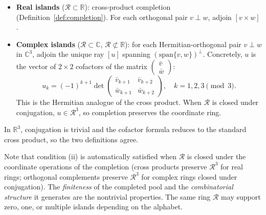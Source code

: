 \documentclass[12pt,a4paper]{article}
\newcommand{\R}{\mathbb{R}}
\newcommand{\C}{\mathbb{C}}
\begin{document}
\begin{itemize}
    \item \textbf{Real islands} ($\mathcal{R} \subset \R$): cross-product completion (Definition~\ref{def:completion}). For each orthogonal pair $v \perp w$, adjoin $[v \times w]$.
    \item \textbf{Complex islands} ($\mathcal{R} \subset \C$, $\mathcal{R} \not\subset \R$): for each Hermitian-orthogonal pair $v \perp w$ in $\C^3$, adjoin the unique ray $[u]$ spanning $(\mathrm{span}\{v,w\})^\perp$. Concretely, $u$ is the vector of $2 \times 2$ cofactors of the matrix $\begin{pmatrix} \bar{v} \\ \bar{w} \end{pmatrix}$:
    \[
    u_k = (-1)^{k+1} \det \begin{pmatrix} \bar{v}_{k+1} & \bar{v}_{k+2} \\ \bar{w}_{k+1} & \bar{w}_{k+2} \end{pmatrix}, \quad k = 1,2,3 \pmod{3}.
    \]
    This is the Hermitian analogue of the cross product. When $\mathcal{R}$ is closed under conjugation, $u \in \mathcal{R}^3$, so completion preserves the coordinate ring.
\end{itemize}

\noindent In $\R^3$, conjugation is trivial and the cofactor formula reduces to the standard cross product, so the two definitions agree.

Note that condition (ii) is automatically satisfied when $\mathcal{R}$ is closed under the coordinate operations of the completion (cross products preserve $\mathcal{R}^3$ for real rings; orthogonal complements preserve $\mathcal{R}^3$ for complex rings closed under conjugation). The \emph{finiteness} of the completed pool and the \emph{combinatorial structure} it generates are the nontrivial properties. The same ring $\mathcal{R}$ may support zero, one, or multiple islands depending on the alphabet.
\end{document}
